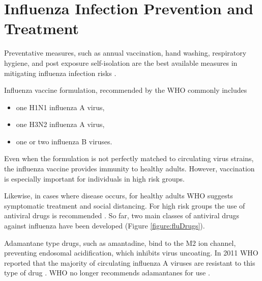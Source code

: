 \section{Influenza Infection Prevention and Treatment}

Preventative measures, such as annual vaccination, hand washing, respiratory hygiene, and post exposure self-isolation are the best available measures in mitigating influenza infection risks \cite{influenza_seasonal_2018}.

Influenza vaccine formulation, recommended by the WHO commonly includes \cite{RecommendedCompositionVaccines}

\begin{itemize}
    \item one H1N1 influenza A virus,
    \item one H3N2 influenza A virus,
    \item one or two influenza B viruses.
\end{itemize}

Even when the formulation is not perfectly matched to circulating virus strains, the influenza vaccine provides immunity to healthy adults. However, vaccination is especially important for individuals in high risk groups.

Likewise, in cases where disease occurs, for healthy adults WHO suggests symptomatic treatment and social distancing. For high risk groups the use of antiviral drugs is recommended \cite{influenza_seasonal_2018}. So far, two main classes of antiviral drugs against influenza have been developed (Figure \ref{figure:fluDrugs}).

Adamantane type drugs, such as amantadine, bind to the M2 ion channel, preventing endosomal acidification, which inhibits virus uncoating. In 2011 WHO reported that the majority of circulating influenza A viruses are resistant to this type of drug \cite{whoAntivirals2011}. WHO no longer recommends adamantanes for use \cite{influenza_seasonal_2018}.

